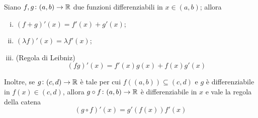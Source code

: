 \begin{theorem}
    \label{th:6.2}
    Siano $f,g\colon (a,b)\to \amsbb{R}$ due funzioni differenziabili in $x\in(a,b)$; allora
    \begin{enumerate}[(i)]
        \item $(f+g)'(x) = f'(x) + g'(x)$;
        \item $(\lambda f)'(x) = \lambda f'(x)$;
        \item (Regola di Leibniz)
        \begin{equation}
            \label{eq:6.3}
            (fg)'(x) = f'(x)g(x) + f(x)g'(x)
        \end{equation}
    \end{enumerate}
    Inoltre, se $g\colon (c,d) \to \amsbb{R}$ è tale per cui $f((a,b))\subseteq (c,d)$ e $g$ è differenziabile in $f(x)\in(c,d)$, allora $g\circ f \colon (a,b) \to \amsbb{R}$ è differenziabile in $x$ e vale la regola della catena
    \begin{equation}
        \label{eq:6.4}
        (g\circ f)'(x) = g'(f(x))f'(x)
    \end{equation}
\end{theorem}